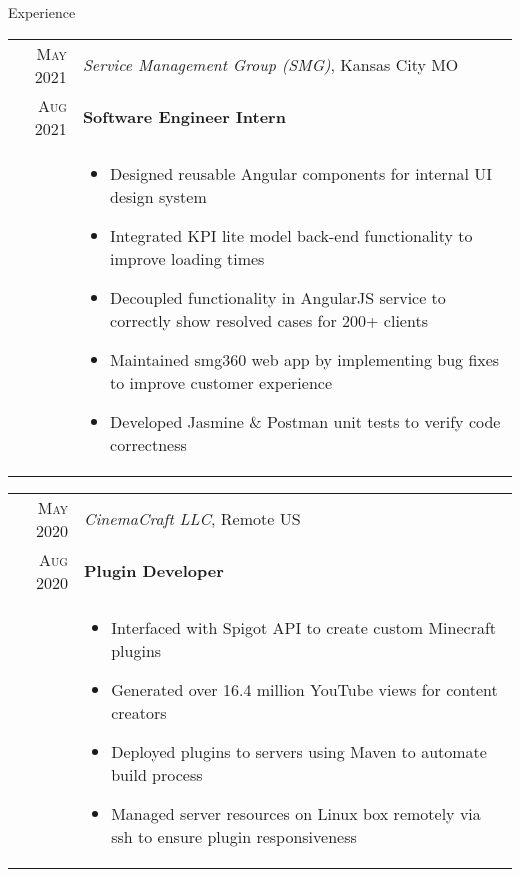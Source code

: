 \documentclass{resume}
\begin{document}
\begin{rSection}{Experience}
{  \begin{tabular}{r|p{16cm}}
    \textsc{May 2021} & \textit{Service Management Group (SMG)}, Kansas City MO \\
    \textsc{Aug 2021}  & \textbf{Software Engineer Intern} \\ &
    \begin{itemize}
      \item {Designed reusable Angular components for internal UI design system}
      \item {Integrated KPI lite model back-end functionality to improve loading times}
      \item {Decoupled functionality in AngularJS service to correctly show resolved cases for 200+ clients}
      \item {Maintained smg360 web app by implementing bug fixes to improve customer experience}
      \item {Developed Jasmine \& Postman unit tests to verify code correctness}
    \end{itemize}
  \end{tabular}
  
  \begin{tabular}{r|p{16cm}}
    \textsc{May 2020} & \textit{CinemaCraft LLC}, Remote US \\
    \textsc{Aug 2020} & \textbf{Plugin Developer} \\ &
    \begin{itemize}
      \item {Interfaced with Spigot API to create custom Minecraft plugins}
      \item {Generated over 16.4 million YouTube views for content creators}
      \item {Deployed plugins to servers using Maven to automate build process}
      \item {Managed server resources on Linux box remotely via ssh to ensure plugin responsiveness}
    \end{itemize}
  \end{tabular}
  
}
\end{rSection}
\end{document}
